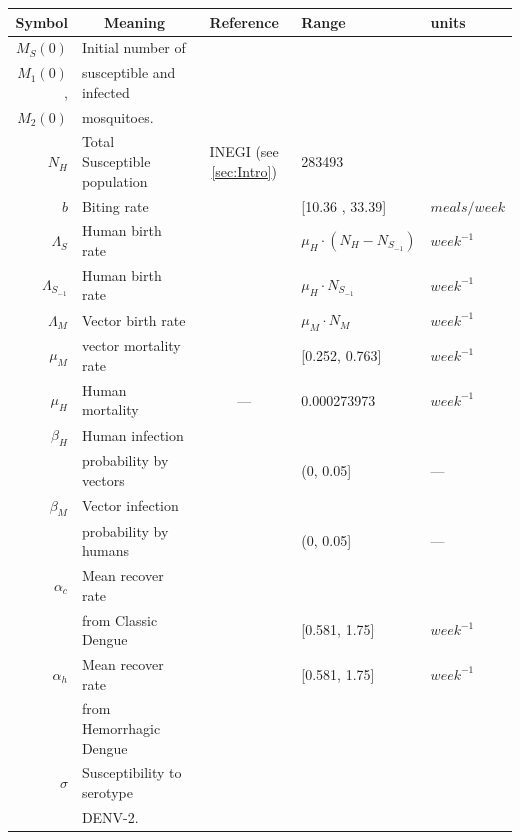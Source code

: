 \begin{table}[htb]
		\begin{tabular}{rlcll}
			\toprule
			Symbol		&	\multicolumn{1}{c}{Meaning} &
				Reference	& Range & units
		\\
		\midrule
			$M_S(0)$
				& Initial number of 
		\\
			$M_1(0)$,
				& susceptible and infected
		\\
		    $M_2(0)$
		    &  mosquitoes.
		\\
		$N_H$
		    & Total Susceptible population
		    &  INEGI (see \cref{sec:Intro})
		    & \num{283493}
		\\
			$b$
			& Biting rate
			&\cite{YasunoM1990}
			&[10.36 , 33.39] & $\si{meals \per week}$ 
		\\
			$\Lambda_S$
				& Human birth rate
				&
				& 
					$\mu_H \cdot (N_H - N_{S_{-1}})$
				& $\si{week^{-1}}$
		\\
			$\Lambda_{S_{-1}}$
				& Human birth rate
				&
				& 
					$\mu_H \cdot N_{S_{-1}}$
				& $\si{week^{-1}}$
		\\
			$\Lambda_M$
			& Vector birth rate
			&
			& $\mu_M \cdot N_M$
			& $\si{week^{-1}}$
		\\
			$\mu_M$
			& vector mortality rate
			& \cite{YANG2009}
            & [\num{0.252}, \num{0.763}] 
            & $\si{week^{-1}}$
    \\
			$\mu_H$
			& Human mortality
			&---
			& \num{0.000273973} 
			& $\si{week^{-1}}$
		\\
			$\beta_H$ 
			&	Human infection 
			\\
      & probability  by vectors
			& \cite{Feng1997a} 
			& (\num{0}, \num{0.05}] 
			& ---
		\\
			$\beta_M$
			& Vector infection 
			\\
      & probability by humans
			& \cite{Feng1997a}& (\num{0}, \num{0.05}] & ---
		\\
			$\alpha_{c}$ 
			& Mean recover rate 
			\\
      & from Classic Dengue
			&\cite{Pinho2010}
			& [\num{0.581}, \num{1.75}] & $\si{week^{-1}}$
		\\
			$\alpha_{h}$	& Mean recover rate
			& \cite{Pinho2010} 
			& [\num{0.581}, \num{1.75}] 
			& $\si{week^{-1}}$
		\\
			& from Hemorrhagic Dengue
		\\
			$\sigma$
			& Susceptibility to serotype 
		\\
			& \ac{DENV-2}.

\end{tabular}
\end{table}

